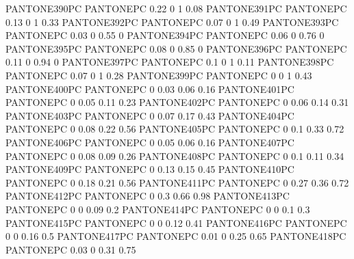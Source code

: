  {PANTONE390PC} {PANTONE\SpotSpace PC} {0.22 0 1 0.08}
 {PANTONE391PC} {PANTONE\SpotSpace PC} {0.13 0 1 0.33}
 {PANTONE392PC} {PANTONE\SpotSpace PC} {0.07 0 1 0.49}
 {PANTONE393PC} {PANTONE\SpotSpace PC} {0.03 0 0.55 0}
 {PANTONE394PC} {PANTONE\SpotSpace PC} {0.06 0 0.76 0}
 {PANTONE395PC} {PANTONE\SpotSpace PC} {0.08 0 0.85 0}
 {PANTONE396PC} {PANTONE\SpotSpace PC} {0.11 0 0.94 0}
 {PANTONE397PC} {PANTONE\SpotSpace PC} {0.1 0 1 0.11}
 {PANTONE398PC} {PANTONE\SpotSpace PC} {0.07 0 1 0.28}
 {PANTONE399PC} {PANTONE\SpotSpace PC} {0 0 1 0.43}
 {PANTONE400PC} {PANTONE\SpotSpace PC} {0 0.03 0.06 0.16}
 {PANTONE401PC} {PANTONE\SpotSpace PC} {0 0.05 0.11 0.23}
 {PANTONE402PC} {PANTONE\SpotSpace PC} {0 0.06 0.14 0.31}
 {PANTONE403PC} {PANTONE\SpotSpace PC} {0 0.07 0.17 0.43}
 {PANTONE404PC} {PANTONE\SpotSpace PC} {0 0.08 0.22 0.56}
 {PANTONE405PC} {PANTONE\SpotSpace PC} {0 0.1 0.33 0.72}
 {PANTONE406PC} {PANTONE\SpotSpace PC} {0 0.05 0.06 0.16}
 {PANTONE407PC} {PANTONE\SpotSpace PC} {0 0.08 0.09 0.26}
 {PANTONE408PC} {PANTONE\SpotSpace PC} {0 0.1 0.11 0.34}
 {PANTONE409PC} {PANTONE\SpotSpace PC} {0 0.13 0.15 0.45}
 {PANTONE410PC} {PANTONE\SpotSpace PC} {0 0.18 0.21 0.56}
 {PANTONE411PC} {PANTONE\SpotSpace PC} {0 0.27 0.36 0.72}
 {PANTONE412PC} {PANTONE\SpotSpace PC} {0 0.3 0.66 0.98}
 {PANTONE413PC} {PANTONE\SpotSpace PC} {0 0 0.09 0.2}
 {PANTONE414PC} {PANTONE\SpotSpace PC} {0 0 0.1 0.3}
 {PANTONE415PC} {PANTONE\SpotSpace PC} {0 0 0.12 0.41}
 {PANTONE416PC} {PANTONE\SpotSpace PC} {0 0 0.16 0.5}
 {PANTONE417PC} {PANTONE\SpotSpace PC} {0.01 0 0.25 0.65}
 {PANTONE418PC} {PANTONE\SpotSpace PC} {0.03 0 0.31 0.75}
